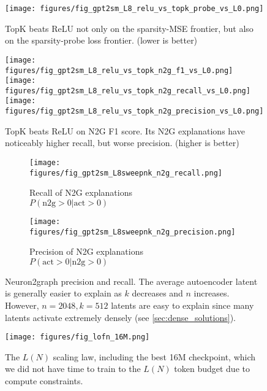 


\begin{figure}
    \centering
    \texttt{[image: figures/fig\_gpt2sm\_L8\_relu\_vs\_topk\_probe\_vs\_L0.png]}
    \caption{TopK beats ReLU not only on the sparsity-MSE frontier, but also on the sparsity-probe loss frontier. (lower is better)}
    \label{fig:relu_vs_topk_probe}
\end{figure}

\begin{figure}
    \centering
    \texttt{[image: figures/fig\_gpt2sm\_L8\_relu\_vs\_topk\_n2g\_f1\_vs\_L0.png]}
    \texttt{[image: figures/fig\_gpt2sm\_L8\_relu\_vs\_topk\_n2g\_recall\_vs\_L0.png]}
    \texttt{[image: figures/fig\_gpt2sm\_L8\_relu\_vs\_topk\_n2g\_precision\_vs\_L0.png]}
    \caption{TopK beats ReLU on N2G F1 score.  Its N2G explanations have noticeably higher recall, but worse precision. (higher is better)}
    \label{fig:relu_vs_topk_n2g}
\end{figure}


\begin{figure*}[t!]
    \begin{subfigure}[b]{0.5\textwidth}
        \centering
        \texttt{[image: figures/fig\_gpt2sm\_L8sweepnk\_n2g\_recall.png]}
        \caption{Recall of N2G explanations\\$P(\text{n2g}>0 | \text{act}>0)$}
        \label{fig:metric_grids_n2g_recall}
    \end{subfigure}%
    \begin{subfigure}[b]{0.5\textwidth}
        \centering
        \texttt{[image: figures/fig\_gpt2sm\_L8sweepnk\_n2g\_precision.png]}
        \caption{Precision of N2G explanations\\$P(\text{act}>0 | \text{n2g}>0)$}
        \label{fig:metric_grids_n2g_precision}
    \end{subfigure}
    \caption{Neuron2graph precision and recall.  The average autoencoder latent is generally easier to explain as $k$ decreases and $n$ increases.  However, $n=2048,k=512$ latents are easy to explain since many latents activate extremely densely (see \autoref{sec:dense_solutions}). 
}
    \label{fig:metric_grids_n2g}
\end{figure*}




\begin{figure}
    \centering
    \texttt{[image: figures/fig\_lofn\_16M.png]}
    \caption{The $L(N)$ scaling law, including the best 16M checkpoint, which we did not have time to train to the $L(N)$ token budget due to compute constraints.}
    \label{fig:gpt4-n-scaling}
\end{figure}








